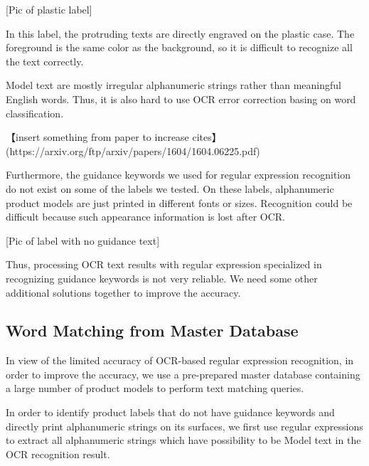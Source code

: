\documentclass[technicalreport]{ieicej}
\begin{document}
        \vspace*{\baselineskip}
        [Pic of plastic label]
        \vspace*{\baselineskip}

        In this label, the protruding texts are directly engraved on the plastic case. The foreground is the same color as the background, so it is difficult to recognize all the text correctly.
        
        Model text are mostly irregular alphanumeric strings rather than meaningful English words. Thus, it is also hard to use OCR error correction basing on word classification.
        
        \vspace*{\baselineskip}

        【insert something from paper to increase cites】\\
        (https://arxiv.org/ftp/arxiv/papers/1604/1604.06225.pdf)

        \vspace*{\baselineskip}
        
        Furthermore, the guidance keywords we used for regular expression recognition do not exist on some of the labels we tested. On these labels, alphanumeric product models are just printed in different fonts or sizes. Recognition could be difficult because such appearance information is lost after OCR.
        
        \vspace*{\baselineskip}
        [Pic of label with no guidance text]
        \vspace*{\baselineskip}
        

        Thus, processing OCR text results with regular expression specialized in recognizing guidance keywords is not very reliable. We need some other additional solutions together to improve the accuracy.
        
    
    \subsection{Word Matching from Master Database}
        In view of the limited accuracy of OCR-based regular expression recognition, in order to improve the accuracy, we use a pre-prepared master database containing a large number of product models to perform text matching queries.
        
        In order to identify product labels that do not have guidance keywords and directly print alphanumeric strings on its surfaces, we first use regular expressions to extract all alphanumeric strings which have possibility to be Model text in the OCR recognition result.
    
\end{document}
